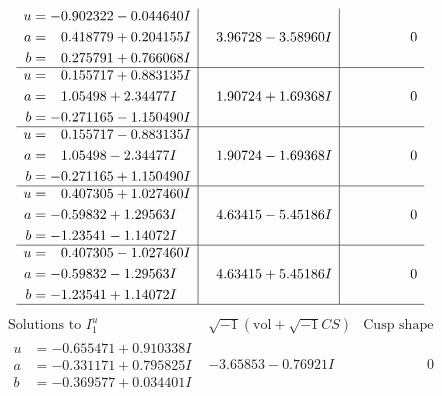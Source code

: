 \documentclass[1p]{elsarticle_modified}
\theoremstyle{definition}
\newcommand{\I}{\sqrt{-1}}
\begin{document}
$$\begin{array}{c|c|c}
\begin{aligned}
u &= -0.902322 - 0.044640 I \\
a &= \phantom{-}0.418779 + 0.204155 I \\
b &= \phantom{-}0.275791 + 0.766068 I\end{aligned}
 & \phantom{-}3.96728 - 3.58960 I & \phantom{-0.000000 } 0 \\ \hline\begin{aligned}
u &= \phantom{-}0.155717 + 0.883135 I \\
a &= \phantom{-}1.05498 + 2.34477 I \\
b &= -0.271165 - 1.150490 I\end{aligned}
 & \phantom{-}1.90724 + 1.69368 I & \phantom{-0.000000 } 0 \\ \hline\begin{aligned}
u &= \phantom{-}0.155717 - 0.883135 I \\
a &= \phantom{-}1.05498 - 2.34477 I \\
b &= -0.271165 + 1.150490 I\end{aligned}
 & \phantom{-}1.90724 - 1.69368 I & \phantom{-0.000000 } 0 \\ \hline\begin{aligned}
u &= \phantom{-}0.407305 + 1.027460 I \\
a &= -0.59832 + 1.29563 I \\
b &= -1.23541 - 1.14072 I\end{aligned}
 & \phantom{-}4.63415 - 5.45186 I & \phantom{-0.000000 } 0 \\ \hline\begin{aligned}
u &= \phantom{-}0.407305 - 1.027460 I \\
a &= -0.59832 - 1.29563 I \\
b &= -1.23541 + 1.14072 I\end{aligned}
 & \phantom{-}4.63415 + 5.45186 I & \phantom{-0.000000 } 0\\
 \hline 
 \end{array}$$\newpage$$\begin{array}{c|c|c}  
\text{Solutions to }I^u_{1}& \I (\text{vol} + \sqrt{-1}CS) & \text{Cusp shape}\\
 \hline 
\begin{aligned}
u &= -0.655471 + 0.910338 I \\
a &= -0.331171 + 0.795825 I \\
b &= -0.369577 + 0.034401 I\end{aligned}
 & -3.65853 - 0.76921 I & \phantom{-0.000000 } 0 \\ \hline\begin{aligned}

\end{aligned}
\end{array}$$
\end{document}
